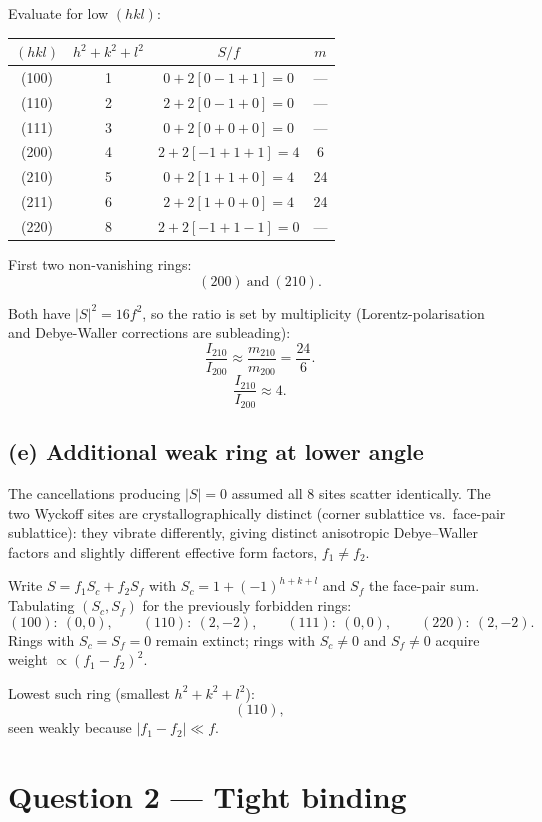 \documentclass[11pt]{article}
\begin{document}
Evaluate for low $(hkl)$:
\begin{center}
\begin{tabular}{cccc}
\toprule
$(hkl)$ & $h^2+k^2+l^2$ & $S/f$ & $m$ \\
\midrule
(100) & 1 & $0+2[0-1+1]=0$ & --- \\
(110) & 2 & $2+2[0-1+0]=0$ & --- \\
(111) & 3 & $0+2[0+0+0]=0$ & --- \\
(200) & 4 & $2+2[-1+1+1]=4$ & 6 \\
(210) & 5 & $0+2[1+1+0]=4$ & 24 \\
(211) & 6 & $2+2[1+0+0]=4$ & 24 \\
(220) & 8 & $2+2[-1+1-1]=0$ & --- \\
\bottomrule
\end{tabular}
\end{center}

First two non-vanishing rings:
\[
\boxed{\;(200)\ \text{and}\ (210).\;}
\]

Both have $|S|^2 = 16 f^2$, so the ratio is set by multiplicity (Lorentz-polarisation and Debye-Waller corrections are subleading):
\[
\frac{I_{210}}{I_{200}} \approx \frac{m_{210}}{m_{200}} = \frac{24}{6}.
\]
\[
\boxed{\;\frac{I_{210}}{I_{200}} \approx 4.\;}
\]

\subsection*{(e) Additional weak ring at lower angle}

The cancellations producing $|S|=0$ assumed all 8 sites scatter identically. The two Wyckoff sites are crystallographically distinct (corner sublattice vs.\ face-pair sublattice): they vibrate differently, giving distinct anisotropic Debye--Waller factors and slightly different effective form factors, $f_1\neq f_2$.

Write $S = f_1 S_c + f_2 S_f$ with $S_c = 1+(-1)^{h+k+l}$ and $S_f$ the face-pair sum. Tabulating $(S_c, S_f)$ for the previously forbidden rings:
\[
(100):\ (0,0),\qquad (110):\ (2,-2),\qquad (111):\ (0,0),\qquad (220):\ (2,-2).
\]
Rings with $S_c=S_f=0$ remain extinct; rings with $S_c\ne 0$ and $S_f\ne 0$ acquire weight $\propto (f_1-f_2)^2$.

Lowest such ring (smallest $h^2+k^2+l^2$):
\[
\boxed{\;(110),\;}
\]
seen weakly because $|f_1-f_2|\ll f$.

\section*{Question 2 --- Tight binding}
\end{document}
